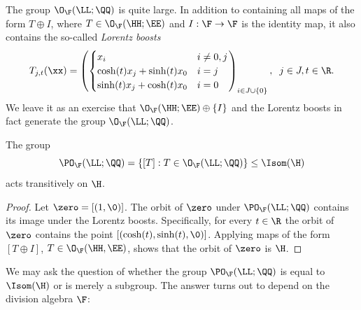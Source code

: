 The group $\O_\F(\LL;\QQ)$ is quite large. In addition to containing all maps of the form $T\oplus I$, where $T\in\O_\F(\HH;\EE)$ and $I:\F\to\F$ is the identity map, it also contains the so-called \emph{Lorentz boosts}
\begin{equation}
\label{lorentzboost}
T_{j,t}(\xx) = \left(\begin{cases}
x_i & i\neq 0,j\\
\cosh(t) x_j + \sinh(t) x_0 & i = j\\
\sinh(t) x_j + \cosh(t) x_0 & i = 0
\end{cases}\right)_{i\in J\cup\{0\}}, \;\; j\in J, t\in\R.
\end{equation}
We leave it as an exercise that $\O_\F(\HH;\EE)\oplus\{I\}$ and the Lorentz boosts in fact generate the group $\O_\F(\LL;\QQ)$.

\begin{observation}
\label{observationtransitivity}
The group
\[
\PO_\F(\LL;\QQ) = \{[T] : T\in\O_\F(\LL;\QQ)\} \leq \Isom(\H)
\]
acts transitively on $\H$.
\end{observation}
\begin{proof}
Let $\zero = [(1,\0)]$. The orbit of $\zero$ under $\PO_\F(\LL;\QQ)$ contains its image under the Lorentz boosts. Specifically, for every $t\in\R$ the orbit of $\zero$ contains the point $[(\cosh(t),\sinh(t),\0)]$. Applying maps of the form $[T\oplus I]$, $T\in \O_\F(\HH,\EE)$, shows that the orbit of $\zero$ is $\H$.
\end{proof}

We may ask the question of whether the group $\PO_\F(\LL;\QQ)$ is equal to $\Isom(\H)$ or is merely a subgroup. The answer turns out to depend on the division algebra $\F$:

